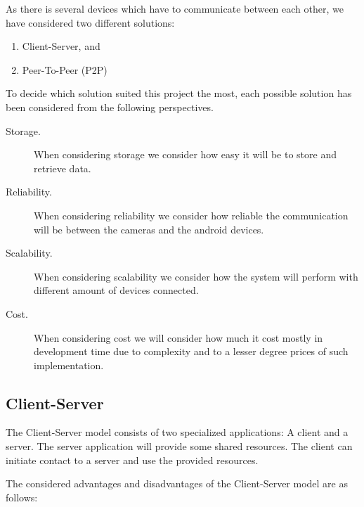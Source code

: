 As there is several devices which have to communicate between each other, we have considered two different solutions:

\begin{enumerate}
\item Client-Server, and
\item Peer-To-Peer (P2P)
\end{enumerate}

To decide which solution suited this project the most, each possible solution has been considered from the following perspectives.

\begin{description}
\item[Storage.] When considering storage we consider how easy it will be to store and retrieve data.
\item[Reliability.] When considering reliability we consider how reliable the communication will be between the cameras and the android devices.
\item[Scalability.] When considering scalability we consider how the system will perform with different amount of devices connected.
\item[Cost.] When considering cost we will consider how much it cost mostly in development time due to complexity and to a lesser degree prices of such implementation.
\end{description}

\subsection{Client-Server}
The Client-Server model consists of two specialized applications: A client and a server. The server application will provide some shared resources. The client can initiate contact to a server and use the provided resources.

The considered advantages and disadvantages of the Client-Server model are as follows:


